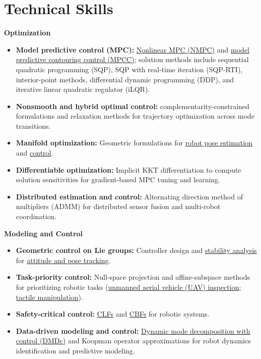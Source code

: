 \documentclass[letterpaper,11pt]{article}
\begin{document}
\section{Technical Skills}
{\small\textbf{Optimization}\par}
\begin{itemize}[leftmargin=0.22in, itemsep=2pt, parsep=0pt, topsep=4pt]
\small
\item \textbf{Model predictive control (MPC):} \href{https://arxiv.org/abs/2510.11525}{Nonlinear MPC (NMPC)} and \href{https://arxiv.org/abs/2609.36482}{model predictive contouring control (MPCC)}; solution methods include sequential quadratic programming (SQP), SQP with real-time iteration (SQP-RTI), interior-point methods, differential dynamic programming (DDP), and iterative linear quadratic regulator (iLQR).
\item \textbf{Nonsmooth and hybrid optimal control:} complementarity-constrained formulations and relaxation methods for trajectory optimization across mode transitions.
\item \textbf{Manifold optimization:} Geometric formulations for \href{https://arxiv.org/abs/2410.13541}{robot pose estimation} and \href{https://arxiv.org/abs/2510.11525}{control}.
\item \textbf{Differentiable optimization:} Implicit KKT differentiation to compute solution sensitivities for gradient-based MPC tuning and learning.
\item \textbf{Distributed estimation and control:} Alternating direction method of multipliers (ADMM) for distributed sensor fusion and multi-robot coordination.
\end{itemize}
{\small\textbf{Modeling and Control}\par}
\begin{itemize}[leftmargin=0.22in, itemsep=2pt, parsep=0pt, topsep=4pt]
\small
\item \textbf{Geometric control on Lie groups:} Controller design and \href{https://arxiv.org/abs/2504.08841}{stability analysis} for \href{https://arxiv.org/abs/2510.11525}{attitude and pose tracking}.
\item \textbf{Task-priority control:} Null-space projection and affine-subspace methods for prioritizing robotic tasks (\href{https://arxiv.org/abs/2311.08019}{unmanned aerial vehicle (UAV) inspection}; \href{https://arxiv.org/abs/2605.20392}{tactile manipulation}).
\item \textbf{Safety-critical control:} \href{https://arxiv.org/abs/2504.08841}{CLFs} and \href{https://arxiv.org/abs/2504.08841}{CBFs} for robotic systems.
\item \textbf{Data-driven modeling and control:} \href{https://doi.org/10.1016/j.ifacol.2023.12.088}{Dynamic mode decomposition with control (DMDc)} and Koopman operator approximations for robot dynamics identification and predictive modeling.
\end{itemize}
\newpage
\end{document}
